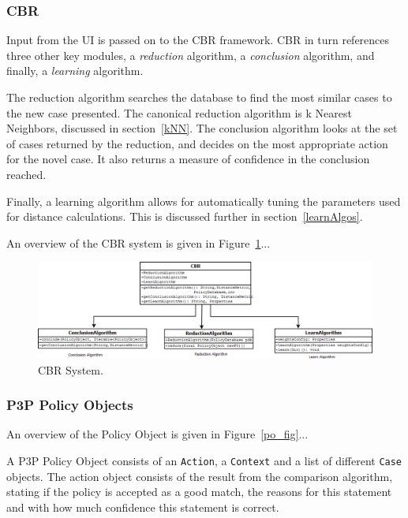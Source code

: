 \subsubsection{CBR} %
Input from the UI is passed on to the CBR framework. CBR in turn references three other key modules, a \emph{reduction} algorithm, a \emph{conclusion} algorithm, and finally, a \emph{learning} algorithm.

The reduction algorithm searches the database to find the most similar cases to the new case presented. The canonical reduction algorithm is k Nearest Neighbors, discussed in section~\ref{kNN}. The conclusion algorithm looks at the set of cases returned by the reduction, and decides on the most appropriate action for the novel case. It also returns a measure of confidence in the conclusion reached.

Finally, a learning algorithm allows for automatically tuning the parameters used for distance calculations. This is discussed further in section~\ref{learnAlgos}.

An overview of the CBR system is given in Figure~\ref{cbr_fig}...


\begin{figure}[htbp]
\begin{center}
\includegraphics[width = \textwidth]{DesignReport/uml/CBR.png}
\caption{CBR System.}
\label{cbr_fig}
\end{center}
\end{figure}


\subsubsection{P3P Policy Objects}
An overview of the Policy Object is given in Figure~\ref{po_fig}...

A P3P Policy Object consists of an \texttt{Action}, a \texttt{Context} and a list of different \texttt{Case} objects. The action object consists of the result from the comparison algorithm, stating if the policy is accepted as a good match, the reasons for this statement and with how much confidence this statement is correct.

